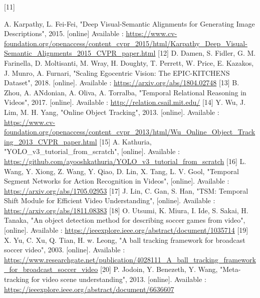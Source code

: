 \documentclass{article}
\begin{document}
\newline
\hypertarget{ref11}{[11]}  A. Karpathy, L. Fei-Fei, "Deep Visual-Semantic Alignments for Generating Image Descriptions", 2015. [online] Available : \url{https://www.cv-foundation.org/openaccess/content_cvpr_2015/html/Karpathy_Deep_Visual-Semantic_Alignments_2015_CVPR_paper.html}
\newline
\hypertarget{ref12}{[12]}  D. Damen, S. Fidler, G. M. Farinella, D. Moltisanti, M. Wray, H. Doughty, T. Perrett, W. Price, E. Kazakos, J. Munro, A. Furnari, "Scaling Egocentric Vision: The EPIC-KITCHENS Dataset", 2018. [online]. Available :  \url{https://arxiv.org/abs/1804.02748}
\newline
\hypertarget{ref13}{[13]} B. Zhou, A. ANdonian, A. Oliva, A. Torralba, "Temporal Relational Reasoning in Videos", 2017. [online]. Available :  \url{http://relation.csail.mit.edu/}
\newline
\hypertarget{ref14}{[14]} Y. Wu, J. Lim, M. H. Yang, "Online Object Tracking", 2013. [online]. Available :  \url{https://www.cv-foundation.org/openaccess/content_cvpr_2013/html/Wu_Online_Object_Tracking_2013_CVPR_paper.html}
\newline
\hypertarget{ref15}{[15]} A. Kathuria, "YOLO\_v3\_tutorial\_from\_scratch", [online]. Available :  \url{https://github.com/ayooshkathuria/YOLO_v3_tutorial_from_scratch}
\newline
\hypertarget{ref16}{[16]} L. Wang, Y. Xiong, Z. Wang, Y. Qiao, D. Lin, X. Tang, L. V. Gool, "Temporal Segment Networks for Action Recognition in Videos", [online]. Available :  \url{https://arxiv.org/abs/1705.02953}
\newline
\hypertarget{ref17}{[17]} J. Lin, C. Gan, S. Han, "TSM: Temporal Shift Module for Efficient Video Understanding", [online]. Available :  \url{https://arxiv.org/abs/1811.08383}
\hypertarget{ref18}{[18]} O. Utsumi, K. Miura, I. Ide, S. Sakai, H. Tanaka, "An object detection method for describing soccer games from video", [online]. Available :  \url{https://ieeexplore.ieee.org/abstract/document/1035714}
\hypertarget{ref19}{[19]} X. Yu, C. Xu, Q. Tian, H. w. Leong, "A ball tracking framework for broadcast soccer video", 2003. [online]. Available :  \url{https://www.researchgate.net/publication/4028111_A_ball_tracking_framework_for_broadcast_soccer_video}
\hypertarget{ref20}{[20]} P. Jodoin, Y. Benezeth, Y. Wang, "Meta-tracking for video scene understanding", 2013. [online]. Available :  \url{https://ieeexplore.ieee.org/abstract/document/6636607}
\newline
\end{document}
